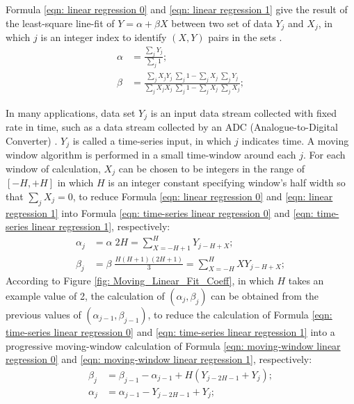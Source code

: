 \documentclass[twoside]{article}
\numberwithin{equation}{section}
\begin{document}
Formula \eqref{eqn: linear regression 0} and \eqref{eqn: linear regression 1} give the result of the least-square line-fit of $Y = \alpha + \beta X$ between two set of data ${Y_j}$ and ${X_j}$, in which $j$ is an integer index to identify $(X, Y)$ pairs in the sets \cite{Numerical_Recipes}.
\begin{align}
\label{eqn: linear regression 0}
\alpha &= \frac{\sum_{j} Y_{j} }{\sum_{j} 1}; \\
\label{eqn: linear regression 1}
\beta &= \frac{\sum_{j} X_{j} Y_{j} \; \sum_{j} 1 - \sum_{j} X_{j} \; \sum_{j} Y_{j}}
    {\sum_{j} X_{j} X_{j} \; \sum_{j} 1 - \sum_{j} X_{j} \; \sum_{j} X_{j} };
\end{align}

In many applications, data set ${Y_j}$ is an input data stream collected with fixed rate in time, such as a data stream collected by an ADC (Analogue-to-Digital Converter) \cite{Electronics}.  ${Y_j}$ is called a time-series input, in which $j$ indicates time.  A moving window algorithm \cite{Numerical_Recipes} is performed in a small time-window around each $j$.  For each window of calculation, ${X_j}$ can be chosen to be integers in the range of $[-H, +H]$ in which $H$ is an integer constant specifying window’s half width so that $\sum_{j} X_{j} = 0$, to reduce Formula \eqref{eqn: linear regression 0} and \eqref{eqn: linear regression 1} into Formula \eqref{eqn: time-series linear regression 0} and \eqref{eqn: time-series linear regression 1}, respectively:
\begin{align}
\label{eqn: time-series linear regression 0}
\alpha _{j} &= \alpha \; 2 H = \sum_{X=-H+1}^{H} Y_{j-H+X}; \\
\label{eqn: time-series linear regression 1}
\beta _{j} &= \beta \; \frac{H (H+1)(2H+1)}{3} = \sum_{X=-H}^{H} X Y_{j-H+X}; 
\end{align}
According to Figure \ref{fig: Moving_Linear_Fit_Coeff}, in which $H$ takes an example value of 2, the calculation of $(\alpha _{j}, \beta _{j})$ can be obtained from the previous values of $(\alpha _{j-1}, \beta _{j-1})$, to reduce the calculation of Formula \eqref{eqn: time-series linear regression 0} and \eqref{eqn: time-series linear regression 1} into a progressive moving-window calculation of Formula \eqref{eqn: moving-window linear regression 0} and \eqref{eqn: moving-window linear regression 1}, respectively:
\begin{align}
\label{eqn: moving-window linear regression 0}
\beta _{j} &= \beta _{j-1} - \alpha _{j-1} + H \left(Y_{j-2H-1} + Y_{j} \right); \\
\label{eqn: moving-window linear regression 1}
\alpha_{j} &= \alpha _{j-1} - Y_{j-2H-1} + Y_{j};
\end{align}
\end{document}
